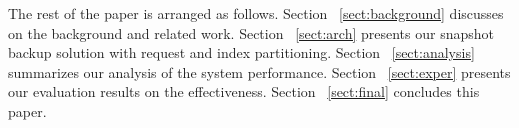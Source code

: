 The rest of the paper is arranged as follows. 
Section ~\ref{sect:background}
discusses on the background and related work.
Section ~\ref{sect:arch} presents our snapshot backup solution with request and index partitioning.
Section ~\ref{sect:analysis} summarizes  our analysis of the system performance.
Section ~\ref{sect:exper} presents  our evaluation results on the effectiveness.
Section ~\ref{sect:final} concludes this paper.
